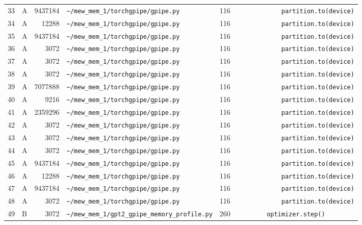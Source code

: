 \documentclass{article}
\begin{document}
\begin{longtable}{r l r p{6.5cm} r p{7.0cm}}
33 & A & 9437184 & \lstinline|~/mew_mem_1/torchgpipe/gpipe.py| & 116 & \lstinline|            partition.to(device)| \\
34 & A & 12288 & \lstinline|~/mew_mem_1/torchgpipe/gpipe.py| & 116 & \lstinline|            partition.to(device)| \\
35 & A & 9437184 & \lstinline|~/mew_mem_1/torchgpipe/gpipe.py| & 116 & \lstinline|            partition.to(device)| \\
36 & A & 3072 & \lstinline|~/mew_mem_1/torchgpipe/gpipe.py| & 116 & \lstinline|            partition.to(device)| \\
37 & A & 3072 & \lstinline|~/mew_mem_1/torchgpipe/gpipe.py| & 116 & \lstinline|            partition.to(device)| \\
38 & A & 3072 & \lstinline|~/mew_mem_1/torchgpipe/gpipe.py| & 116 & \lstinline|            partition.to(device)| \\
39 & A & 7077888 & \lstinline|~/mew_mem_1/torchgpipe/gpipe.py| & 116 & \lstinline|            partition.to(device)| \\
40 & A & 9216 & \lstinline|~/mew_mem_1/torchgpipe/gpipe.py| & 116 & \lstinline|            partition.to(device)| \\
41 & A & 2359296 & \lstinline|~/mew_mem_1/torchgpipe/gpipe.py| & 116 & \lstinline|            partition.to(device)| \\
42 & A & 3072 & \lstinline|~/mew_mem_1/torchgpipe/gpipe.py| & 116 & \lstinline|            partition.to(device)| \\
43 & A & 3072 & \lstinline|~/mew_mem_1/torchgpipe/gpipe.py| & 116 & \lstinline|            partition.to(device)| \\
44 & A & 3072 & \lstinline|~/mew_mem_1/torchgpipe/gpipe.py| & 116 & \lstinline|            partition.to(device)| \\
45 & A & 9437184 & \lstinline|~/mew_mem_1/torchgpipe/gpipe.py| & 116 & \lstinline|            partition.to(device)| \\
46 & A & 12288 & \lstinline|~/mew_mem_1/torchgpipe/gpipe.py| & 116 & \lstinline|            partition.to(device)| \\
47 & A & 9437184 & \lstinline|~/mew_mem_1/torchgpipe/gpipe.py| & 116 & \lstinline|            partition.to(device)| \\
48 & A & 3072 & \lstinline|~/mew_mem_1/torchgpipe/gpipe.py| & 116 & \lstinline|            partition.to(device)| \\
49 & B & 3072 & \lstinline|~/mew_mem_1/gpt2_gpipe_memory_profile.py| & 260 & \lstinline|        optimizer.step()| \\

\end{longtable}
\end{document}
